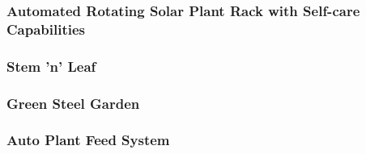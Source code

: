 \subsubsection{Automated Rotating Solar Plant Rack with Self-care Capabilities}

\subsubsection{Stem 'n' Leaf}

\subsubsection{Green Steel Garden}

\subsubsection{Auto Plant Feed System}

